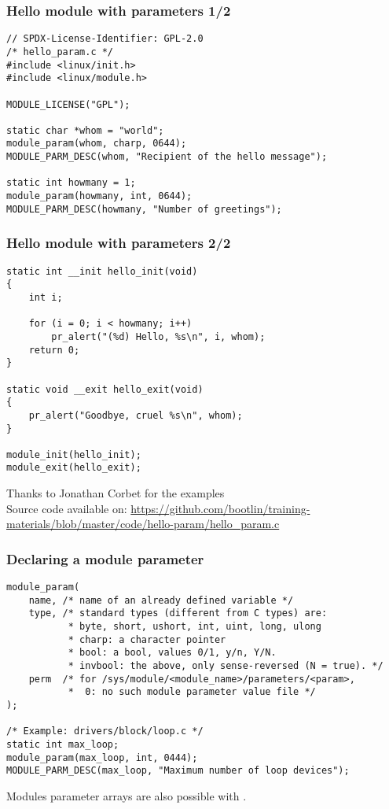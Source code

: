 \begin{frame}[fragile]
  \frametitle{Hello module with parameters 1/2}
\begin{verbatim}
// SPDX-License-Identifier: GPL-2.0
/* hello_param.c */
#include <linux/init.h>
#include <linux/module.h>

MODULE_LICENSE("GPL");

static char *whom = "world";
module_param(whom, charp, 0644);
MODULE_PARM_DESC(whom, "Recipient of the hello message");

static int howmany = 1;
module_param(howmany, int, 0644);
MODULE_PARM_DESC(howmany, "Number of greetings");
\end{verbatim}
\end{frame}

\begin{frame}[fragile]
  \frametitle{Hello module with parameters 2/2}
\begin{verbatim}
static int __init hello_init(void)
{
    int i;

    for (i = 0; i < howmany; i++)
        pr_alert("(%d) Hello, %s\n", i, whom);
    return 0;
}

static void __exit hello_exit(void)
{
    pr_alert("Goodbye, cruel %s\n", whom);
}

module_init(hello_init);
module_exit(hello_exit);
\end{verbatim}
\footnotesize
Thanks to Jonathan Corbet for the examples\\
\tiny
Source code available on:
\url{https://github.com/bootlin/training-materials/blob/master/code/hello-param/hello_param.c}
\end{frame}

\begin{frame}[fragile]
  \frametitle{Declaring a module parameter}

\begin{verbatim}
module_param(
    name, /* name of an already defined variable */
    type, /* standard types (different from C types) are:
           * byte, short, ushort, int, uint, long, ulong
           * charp: a character pointer
           * bool: a bool, values 0/1, y/n, Y/N.
           * invbool: the above, only sense-reversed (N = true). */
    perm  /* for /sys/module/<module_name>/parameters/<param>,
           *  0: no such module parameter value file */
);

/* Example: drivers/block/loop.c */
static int max_loop;
module_param(max_loop, int, 0444);
MODULE_PARM_DESC(max_loop, "Maximum number of loop devices");
\end{verbatim}
Modules parameter arrays are also possible with
.
\end{frame}
